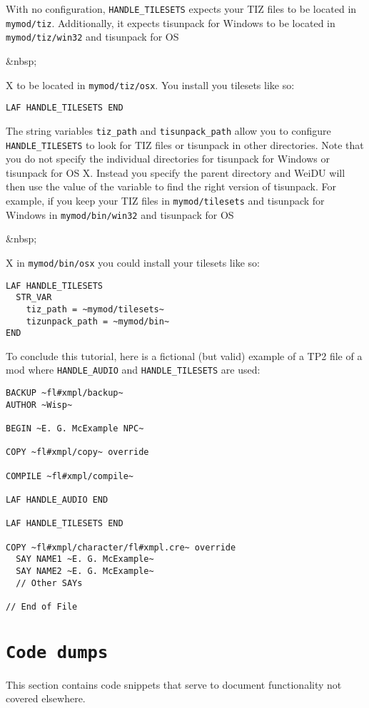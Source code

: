 \documentclass{article}
\def\ttref#1{\ahrefloc{#1}{\tt #1}}
\def\DEFINE#1{{\tt \bf #1}\label{#1}\index{#1}}
\begin{document}
With no configuration, \verb+HANDLE_TILESETS+ expects your TIZ files
to be located in \verb+mymod/tiz+. Additionally, it expects tisunpack
for Windows to be located in \verb+mymod/tiz/win32+ and tisunpack for
OS\begin{rawhtml}&nbsp;\end{rawhtml}X to be located in
\verb+mymod/tiz/osx+. You install you tilesets like so:
\begin{verbatim}
LAF HANDLE_TILESETS END
\end{verbatim}
The string variables \verb+tiz_path+ and \verb+tisunpack_path+ allow
you to configure \verb+HANDLE_TILESETS+ to look for TIZ files or
tisunpack in other directories. Note that you do not specify the
individual directories for tisunpack for Windows or tisunpack for OS
X. Instead you specify the parent directory and WeiDU will then use
the value of the variable \ttref{WEIDU!OS} to find the right version
of tisunpack. For example, if you keep your TIZ files in
\verb+mymod/tilesets+ and tisunpack for Windows in
\verb+mymod/bin/win32+ and tisunpack for
OS\begin{rawhtml}&nbsp;\end{rawhtml}X in \verb+mymod/bin/osx+ you
could install your tilesets like so:
\begin{verbatim}
LAF HANDLE_TILESETS
  STR_VAR
    tiz_path = ~mymod/tilesets~
    tizunpack_path = ~mymod/bin~
END
\end{verbatim}

To conclude this tutorial, here is a fictional (but valid) example of
a TP2 file of a mod where \verb+HANDLE_AUDIO+ and
\verb+HANDLE_TILESETS+ are used:
\begin{verbatim}
BACKUP ~fl#xmpl/backup~
AUTHOR ~Wisp~

BEGIN ~E. G. McExample NPC~

COPY ~fl#xmpl/copy~ override

COMPILE ~fl#xmpl/compile~

LAF HANDLE_AUDIO END

LAF HANDLE_TILESETS END

COPY ~fl#xmpl/character/fl#xmpl.cre~ override
  SAY NAME1 ~E. G. McExample~
  SAY NAME2 ~E. G. McExample~
  // Other SAYs

// End of File
\end{verbatim}



\section{\DEFINE{Code dumps}}
This section contains code snippets that serve to document functionality
not covered elsewhere.
\end{document}
